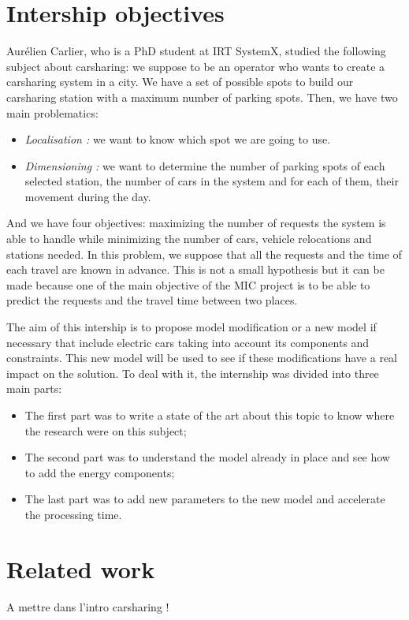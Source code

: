 \begin{bibunit}[ieeetr]
\section{Intership objectives}
Aurélien Carlier, who is a PhD student at IRT SystemX, studied the following subject about carsharing: we suppose to be an operator who wants to create a carsharing system in a city.
We have a set of possible spots to build our carsharing station with a maximum number of parking spots.
Then, we have two main problematics:
\begin{itemize}
\item \emph{Localisation :} we want to know which spot we are going to use.
\item \emph{Dimensioning :} we want to determine the number of parking spots of each selected station, the number of cars in the system and for each of them, their movement during the day. 
\end{itemize}

And we have four objectives: maximizing the number of requests the system is able to handle while minimizing the number of cars, vehicle relocations and stations needed.
In this problem, we suppose that all the requests and the time of each travel are known in advance.
This is not a small hypothesis but it can be made because one of the main objective of the MIC project is to be able to predict the requests and the travel time between two places. 

The aim of this intership is to propose model modification or a new model if necessary that include electric cars taking into account its components and constraints.
This new model will be used to see if these modifications have a real impact on the solution. 
To deal with it, the internship was divided into three main parts:
\begin{itemize}
\item The first part was to write a state of the art about this topic to know where the research were on this subject;
\item The second part was to understand the model already in place and see how to add the energy components; 
\item The last part was to add new parameters to the new model and accelerate the processing time.
\end{itemize}

\section{Related work}
A mettre dans l'intro carsharing !


\end{bibunit}
